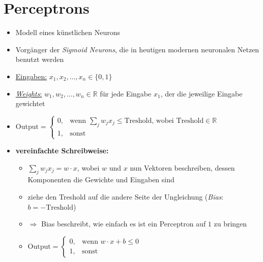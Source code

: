 \documentclass{scrartcl}
\def\layersep{2.5cm}
\begin{document}
\section{Perceptrons}

\begin{itemize}
  \item Modell eines künstlichen Neurons
  \item Vorgänger der \emph{Sigmoid Neurons}, die in heutigen modernen neuronalen Netzen benutzt werden
\end{itemize}

\begin{center}
\end{center}

\begin{itemize}
  \item \underline{Eingaben:} $x_1, x_2, \ldots, x_n \in \lbrace 0, 1 \rbrace$
  \item \underline{\emph{Weights}:} $w_1, w_2, \ldots, w_n \in \mathbb{R}$ für jede Eingabe $x_1$, der die jeweilige Eingabe gewichtet
  \item $\text{Output} = \begin{cases}
      0, & \text{wenn }\sum_j w_jx_j \leq \text{Treshold, wobei Treshold} \in \mathbb{R}\\
    1, & \text{sonst}
  \end{cases}$
  \item \textbf{vereinfachte Schreibweise:}
  \begin{itemize}
    \item $\sum_j w_j x_j = w \cdot x$, wobei $w$ und $x$ nun Vektoren beschreiben, dessen Komponenten die Gewichte und Eingaben sind
    \item ziehe den Treshold auf die andere Seite der Ungleichung (\emph{Bias}: $b = - \text{Treshold}$)
    \item $\Rightarrow$ Bias beschreibt, wie einfach es ist ein Perceptron auf $1$ zu bringen
    \item $\text{Output} = \begin{cases}
      0, & \text{wenn }w \cdot x + b \leq 0\\
      1, & \text{sonst}
    \end{cases}$
  \end{itemize}
\end{itemize}
\end{document}

